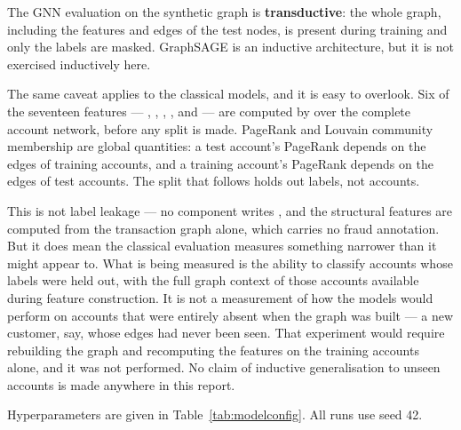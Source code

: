 The GNN evaluation on the synthetic graph is \textbf{transductive}: the whole graph, including the features and edges of the test nodes, is present during training and only the labels are masked. GraphSAGE is an inductive architecture, but it is not exercised inductively here.

The same caveat applies to the classical models, and it is easy to overlook. Six of the seventeen features --- , , , ,  and  --- are computed by  over the complete account network, before any split is made. PageRank and Louvain community membership are global quantities: a test account's PageRank depends on the edges of training accounts, and a training account's PageRank depends on the edges of test accounts. The split that follows holds out labels, not accounts.

This is not label leakage --- no component writes , and the structural features are computed from the transaction graph alone, which carries no fraud annotation. But it does mean the classical evaluation measures something narrower than it might appear to. What is being measured is the ability to classify accounts whose labels were held out, with the full graph context of those accounts available during feature construction. It is not a measurement of how the models would perform on accounts that were entirely absent when the graph was built --- a new customer, say, whose edges had never been seen. That experiment would require rebuilding the graph and recomputing the features on the training accounts alone, and it was not performed. No claim of inductive generalisation to unseen accounts is made anywhere in this report.

Hyperparameters are given in Table~\ref{tab:modelconfig}. All runs use seed 42.

